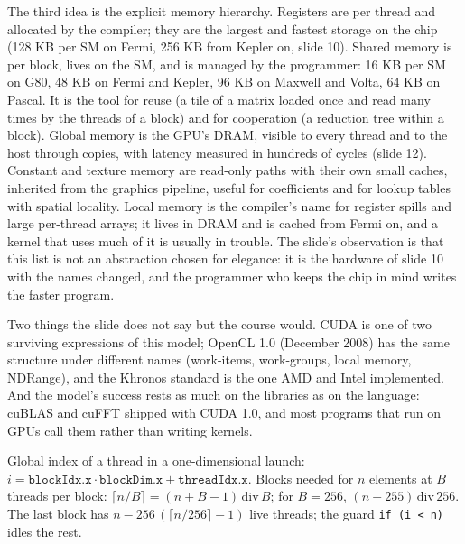 \documentclass[11pt,letterpaper]{article}
\newenvironment{formulas}{\begin{tcolorbox}[formulabox]}{\end{tcolorbox}}
\begin{document}
The third idea is the explicit memory hierarchy. Registers are per thread and allocated by the compiler; they are the largest and fastest storage on the chip (128 KB per SM on Fermi, 256 KB from Kepler on, slide 10). Shared memory is per block, lives on the SM, and is managed by the programmer: 16 KB per SM on G80, 48 KB on Fermi and Kepler, 96 KB on Maxwell and Volta, 64 KB on Pascal. It is the tool for reuse (a tile of a matrix loaded once and read many times by the threads of a block) and for cooperation (a reduction tree within a block). Global memory is the GPU's DRAM, visible to every thread and to the host through copies, with latency measured in hundreds of cycles (slide 12). Constant and texture memory are read-only paths with their own small caches, inherited from the graphics pipeline, useful for coefficients and for lookup tables with spatial locality. Local memory is the compiler's name for register spills and large per-thread arrays; it lives in DRAM and is cached from Fermi on, and a kernel that uses much of it is usually in trouble. The slide's observation is that this list is not an abstraction chosen for elegance: it is the hardware of slide 10 with the names changed, and the programmer who keeps the chip in mind writes the faster program.

Two things the slide does not say but the course would. CUDA is one of two surviving expressions of this model; OpenCL 1.0 (December 2008) has the same structure under different names (work-items, work-groups, local memory, NDRange), and the Khronos standard is the one AMD and Intel implemented. And the model's success rests as much on the libraries as on the language: cuBLAS and cuFFT shipped with CUDA 1.0, and most programs that run on GPUs call them rather than writing kernels.

\begin{formulas}
Global index of a thread in a one-dimensional launch: $i = \texttt{blockIdx.x}\cdot\texttt{blockDim.x} + \texttt{threadIdx.x}$. Blocks needed for $n$ elements at $B$ threads per block: $\lceil n/B\rceil = (n + B - 1)\,\mathrm{div}\,B$; for $B=256$, $(n+255)\,\mathrm{div}\,256$. The last block has $n - 256\,(\lceil n/256\rceil - 1)$ live threads; the guard \texttt{if (i < n)} idles the rest.
\end{formulas}
\end{document}
